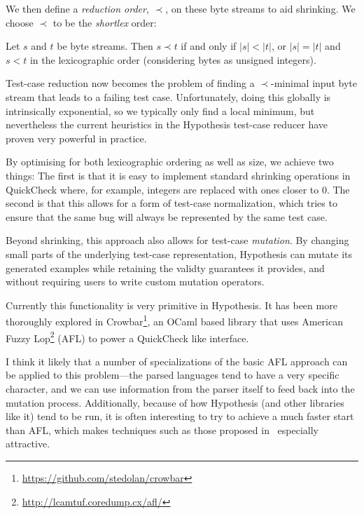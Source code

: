 We then define a \emph{reduction order}, \(\prec\), on these byte streams to aid shrinking.
We choose \(\prec\) to be the \emph{shortlex} order:

\begin{definition}\label{def:shortlex}
Let $s$ and $t$ be byte streams.  Then
\(s \prec t\) if and only if \(|s| < |t|\), or \(|s| = |t|\) and \(s < t\) in the lexicographic order (considering bytes as unsigned integers).
\end{definition}

Test-case reduction now becomes the problem of finding a \(\prec\)-minimal input byte stream that leads to a failing test case.
Unfortunately,
doing this globally is intrinsically exponential,
so we typically only find a local minimum,
but nevertheless the current heuristics in the Hypothesis test-case reducer have proven very powerful in practice.

By optimising for both lexicographic ordering as well as size,
we achieve two things:
The first is that it is easy to implement standard shrinking operations in QuickCheck where,
for example,
integers are replaced with ones closer to \(0\).
The second is that this allows for a form of test-case normalization\cite{DBLP:conf/issta/GroceHK17},
which tries to ensure that the same bug will always be represented by the same test case.

Beyond shrinking,
this approach also allows for test-case \emph{mutation}.
By changing small parts of the underlying test-case representation,
Hypothesis can mutate its generated examples while retaining the validty guarantees it provides,
and without requiring users to write custom mutation operators.

Currently this functionality is very primitive in Hypothesis.
It has been more thoroughly explored in Crowbar\footnote{\url{https://github.com/stedolan/crowbar}},
an OCaml based library that uses American Fuzzy Lop\footnote{\url{http://lcamtuf.coredump.cx/afl/}} (AFL) to power a QuickCheck like interface.

I think it likely that a number of specializations of the basic AFL approach can be applied to this problem---the
parsed languages tend to have a very specific character,
and we can use information from the parser itself to feed back into the mutation process.
Additionally,
because of how Hypothesis (and other libraries like it) tend to be run,
it is often interesting to try to achieve a much faster start than AFL,
which makes techniques such as those proposed in~\cite{DBLP:conf/ccs/BohmePR16,DBLP:journals/corr/abs-1709-07101} especially attractive.

